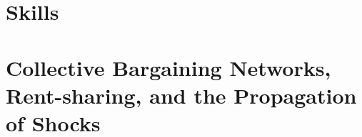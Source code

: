 \documentclass{report}
\begin{document}



\section*{\Large{}}


\setcounter{section}{0}%
\renewcommand{\thesection}{\arabic{chapter}.\Alph{section}}%

\setcounter{table}{0}%
\setcounter{figure}{0}%

\renewcommand{\thetable}{\arabic{chapter}.\Alph{table}}%
\captionsetup{labelformat=simple}

\renewcommand{\thefigure}{\arabic{chapter}.\Alph{figure}}%
\captionsetup{labelformat=simple}



\clearpage

\chapter{Skills}


\renewcommand{\thesection}{\arabic{chapter}.\arabic{section}} %

\setcounter{table}{0}%
\setcounter{figure}{0}%

\renewcommand{\thetable}{\arabic{chapter}.\arabic{table}}%
\captionsetup{labelformat=simple}
\renewcommand{\thefigure}{\arabic{chapter}.\arabic{figure}}%
\captionsetup{labelformat=simple}

% 

\clearpage

\chapter{Collective Bargaining Networks, Rent-sharing, 
         and the Propagation of Shocks}

\renewcommand{\thesection}{\arabic{chapter}.\arabic{section}} %

\setcounter{table}{0}%
\setcounter{figure}{0}%

\renewcommand{\thetable}{\arabic{chapter}.\arabic{table}}%
\captionsetup{labelformat=simple}
\renewcommand{\thefigure}{\arabic{chapter}.\arabic{figure}}%
\captionsetup{labelformat=simple}

% 


\printbibliography[title={BIBLIOGRAPHY}]
\end{document}

